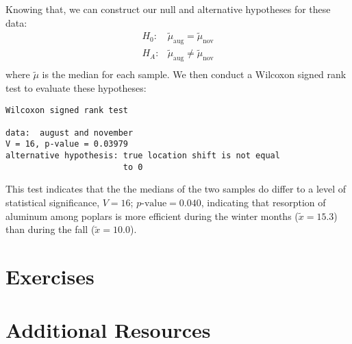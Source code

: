 Knowing that, we can construct our null and alternative hypotheses for these data:
\begin{eqnarray*}
H_0:& \tilde{\mu}_{\text{aug}} = \tilde{\mu}_{\text{nov}} \\
H_A:&  \tilde{\mu}_{\text{aug}} \neq \tilde{\mu}_{\text{nov}} \\
\end{eqnarray*}
where $\tilde{\mu}$ is the median for each sample. We then conduct a Wilcoxon signed rank test to evaluate these hypotheses:

\begin{framed}
\begin{Verbatim}[samepage=TRUE]
	Wilcoxon signed rank test

data:  august and november
V = 16, p-value = 0.03979
alternative hypothesis: true location shift is not equal
                        to 0
\end{Verbatim}
\end{framed}

This test indicates that the the medians of the two samples do differ to a level of statistical significance, $V = 16$; $p\text{-value}=0.040$, indicating that resorption of aluminum among poplars is more efficient during the winter months ($\tilde{x}=15.3$) than during the fall ($\tilde{x}=10.0$).

\section{Exercises}

\section{Additional Resources}

